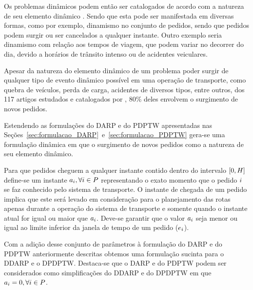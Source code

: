 Os problemas dinâmicos podem então ser catalogados de acordo com a natureza de
seu elemento dinâmico \cite{psaraftis_dynamic_2015}.
Sendo que esta pode ser manifestada em diversas formas, como por exemplo,
dinamismo no conjunto de pedidos, sendo que pedidos podem surgir ou ser
cancelados a qualquer instante.
Outro exemplo seria dinamismo com relação aos tempos de viagem, que podem
variar no decorrer do dia, devido a horários de trânsito intenso ou de
acidentes veiculares.

Apesar da natureza do elemento dinâmico de um problema poder surgir de qualquer
tipo de evento dinâmico possível em uma operação de transporte, como quebra de
veículos, perda de carga, acidentes de diversos tipos, entre outros, dos 117
artigos estudados e catalogados por  \textcite{psaraftis_dynamic_2015}, 80\%
deles envolvem o surgimento de novos pedidos.

Estendendo as formulações do DARP e do PDPTW apresentadas nas
Seções~\ref{sec:formulacao_DARP}~e~\ref{sec:formulacao_PDPTW} gera-se uma
formulação dinâmica em que o surgimento de novos pedidos como a natureza de 
seu elemento dinâmico.

Para que pedidos cheguem a qualquer instante contido dentro
do intervalo $[0, H]$ define-se um instante 
$a_i, \forall i \in P$ representando 
o exato momento que o pedido $i$ se faz conhecido pelo sistema de 
transporte.
O instante de chegada de um pedido implica que este será levado
em consideração para o planejamento das rotas apenas durante a
operação do sistema de transporte e somente quando o instante atual for
igual ou maior que $a_i$.
Deve-se garantir que o valor $a_i$ seja menor ou igual ao 
limite inferior da janela de tempo de um pedido 
($e_i$).

Com a adição desse conjunto de parâmetros à formulação do DARP e do PDPTW
anteriormente descritas obtemos uma formulação sucinta para o DDARP e o DPDPTW.
Destaca-se que o DARP e do PDPTW podem ser considerados como simplificações do
DDARP e do DPDPTW em que $a_i = 0, \forall i \in
P$.

